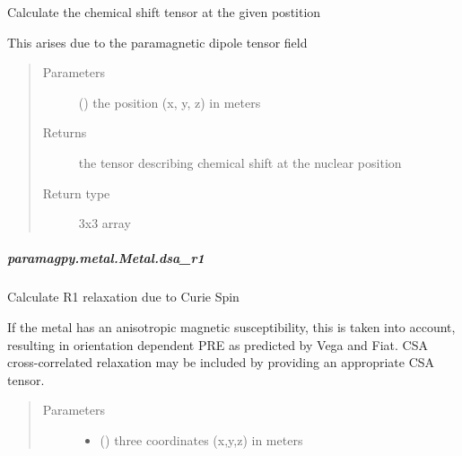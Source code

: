 \documentclass[a4paper,10pt,english,openany,oneside]{sphinxmanual}
\begin{document}
\begin{fulllineitems}
\begin{fulllineitems}
\begin{fulllineitems}
\label{\detokenize{reference/generated/paramagpy.metal.Metal.dipole_shift_tensor:paramagpy.metal.Metal.dipole_shift_tensor}}
Calculate the chemical shift tensor at the given postition

This arises due to the paramagnetic dipole tensor field
\begin{quote}\begin{description}
\item[{Parameters}] \leavevmode
{} () \textendash{} the position (x, y, z) in meters

\item[{Returns}] \leavevmode
{} \textendash{} the tensor describing chemical shift at the nuclear position

\item[{Return type}] \leavevmode
3x3 array

\end{description}\end{quote}

\end{fulllineitems}



\subparagraph{paramagpy.metal.Metal.dsa\_r1}
\label{\detokenize{reference/generated/paramagpy.metal.Metal.dsa_r1:paramagpy-metal-metal-dsa-r1}}\label{\detokenize{reference/generated/paramagpy.metal.Metal.dsa_r1::doc}}

\begin{fulllineitems}
\label{\detokenize{reference/generated/paramagpy.metal.Metal.dsa_r1:paramagpy.metal.Metal.dsa_r1}}
Calculate R1 relaxation due to Curie Spin

If the metal has an anisotropic magnetic susceptibility, this is
taken into account, resulting in orientation dependent PRE as
predicted by Vega and Fiat. CSA cross-correlated relaxation may
be included by providing an appropriate CSA tensor.
\begin{quote}\begin{description}
\item[{Parameters}] \leavevmode\begin{itemize}
\item {} 
 () \textendash{} three coordinates (x,y,z) in meters


\end{itemize}
\end{description}
\end{quote}
\end{fulllineitems}
\end{fulllineitems}
\end{fulllineitems}
\end{document}
